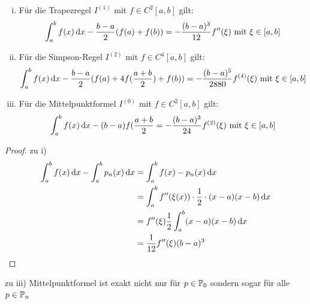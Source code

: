 \documentclass[../Skript.tex]{subfiles}
\begin{document}
\begin{theorem}\hfill
    \begin{enumerate}[i)]
        \item Für die Trapezregel \(I^{(1)}\) mit \(f\in C^2[a,b]\) 
        gilt: \[
        \int^b_af(x)\mathop{}\!\mathrm{d} x-\frac{b-a}{2}(f(a)+f(b)) = -\frac{(b-
        a)^3}{12}f''(\xi) \text{ mit } \xi\in[a,b]
        \]
        \item Für die Simpson-Regel \(I^{(2)}\) mit \(f\in C^4[a,b]\) 
        gilt: \[
        \int^b_af(x)\mathop{}\!\mathrm{d} x-\frac{b-a}{2}(f(a)+4f(\frac{a+b}{2})+f(b)) 
        = 
        -\frac{(b-a)^5}{2880}f^{(4)}(\xi) \text{ mit } \xi\in[a,b]
        \]
        \item Für die Mittelpunktformel \(I^{(0)}\) mit \(f\in 
        C^2[a,b]\) gilt: \[
        \int^b_af(x)\mathop{}\!\mathrm{d} x-(b-a)f(\frac{a+b}{2} = -\frac{(b-
        a)^3}{24}f^{(2)}(\xi) \text{ mit } \xi\in[a,b]
        \]
    \end{enumerate}
\end{theorem}
\begin{proof}
    zu i) \begin{align*}
    \int^b_af(x) \mathop{}\!\mathrm{d} x - \int^b_a p_n(x) \mathop{}\!\mathrm{d} x &= \int^b_a f(x)-
    p_n(x) \mathop{}\!\mathrm{d} 
    x\\
    &=\int^b_a f''(\xi(x))\cdot \frac{1}{2}\cdot(x-a)(x-b)\mathop{}\!\mathrm{d} x\\
    &= f''(\xi)\frac{1}{2}\int^b_a(x-a)(x-b)\mathop{}\!\mathrm{d} x\\
    &= \frac{1}{12}f''(\xi)(b-a)^3
   \end{align*}
\end{proof}
\begin{remark}
    zu iii) Mittelpunktformel ist exakt nicht nur für \(p\in\mathbb{P}_0\) 
    sondern 
    sogar für alle \(p\in\mathbb{P}_n\)
\end{remark}
\end{document}
